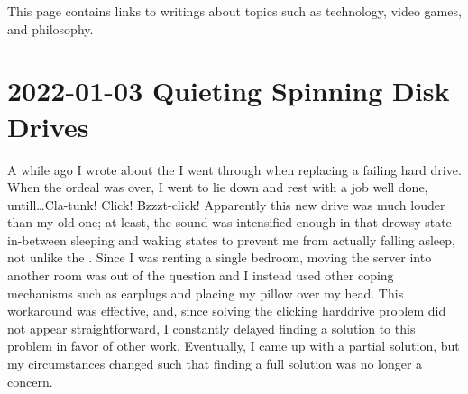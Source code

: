 \documentclass{article}
\begin{document}
This page contains links to writings about topics such as technology, video games, and philosophy.

\tableofchildlinks*

\section{2022-01-03 Quieting Spinning Disk Drives}
A while ago I wrote about the  I went through when replacing a failing hard drive.  When the ordeal was over, I went to lie down and rest with a job well done, untill\ldots Cla-tunk!  Click!  Bzzzt-click!  Apparently this new drive was much louder than my old one; at least, the sound was intensified enough in that drowsy state in-between sleeping and waking states to prevent me from actually falling asleep, not unlike the .  Since I was renting a single bedroom, moving the server into another room was out of the question and I instead used other coping mechanisms such as earplugs and placing my pillow over my head.  This workaround was effective, and, since solving the clicking harddrive problem did not appear straightforward, I constantly delayed finding a solution to this problem in favor of other work.  Eventually, I came up with a partial solution, but my circumstances changed such that finding a full solution was no longer a concern.
\end{document}
